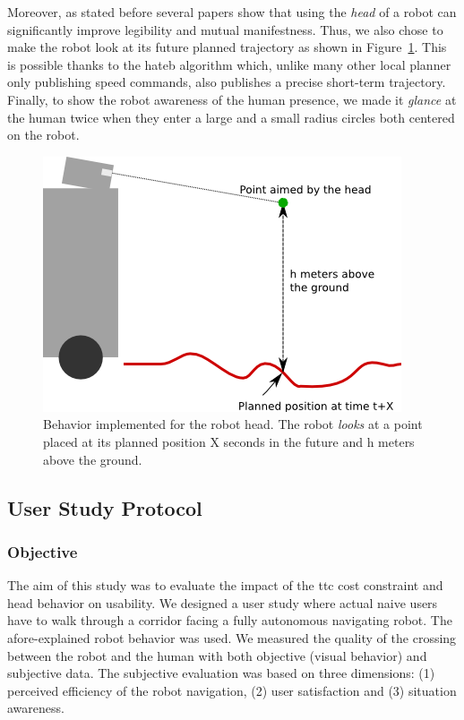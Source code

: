 \documentclass[a4paper,11pt,twoside]{StyleThese}
\begin{document}
Moreover, as stated before several papers show that using the \textit{head} of a robot can significantly improve legibility and mutual manifestness. Thus, we also chose to make the robot look at its future planned trajectory as shown in Figure~\ref{fig:head_gaze_behavior}. This is possible thanks to the \acrshort{hateb} algorithm which, unlike many other local planner only publishing  speed commands, also publishes a precise short-term trajectory. Finally, to show the robot awareness of the human presence, we made it \textit{glance} at the human twice when they enter a large and a small radius circles both centered on the robot.

\begin{figure}[hbtp]
\centering
\includegraphics[scale=0.6]{figures/chapter2/head_traj_follower.png}
\caption{Behavior implemented for the robot head. The robot \textit{looks} at a point placed at its planned position X seconds in the future and h meters above the ground.}
\label{fig:head_gaze_behavior}
\end{figure}

\subsection{User Study Protocol}

\subsubsection{Objective}
The aim of this study was to evaluate the impact of the \acrshort{ttc} cost constraint and head behavior on usability. We designed a user study where actual naive users have to walk through a corridor facing a fully autonomous navigating robot. The afore-explained robot behavior was used. We measured the quality of the crossing between the robot and the human with both objective (visual behavior) and subjective data. The subjective evaluation was based on three dimensions: (1) perceived efficiency of the robot navigation, (2) user satisfaction and (3) situation awareness.
\end{document}

